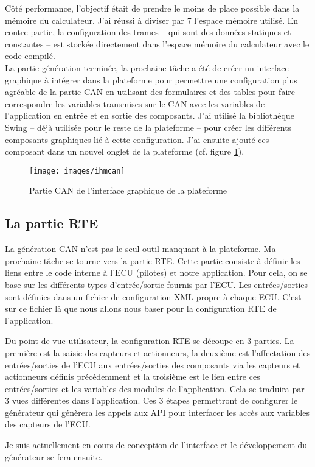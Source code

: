 Côté performance, l'objectif était de prendre le moins de place possible dans la
mémoire du calculateur. J'ai réussi à diviser par 7 l'espace mémoire utilisé. En
contre partie, la configuration des trames -- qui sont des données statiques et
constantes -- est stockée directement dans l'espace mémoire du calculateur avec
le code compilé.\\

La partie génération terminée, la prochaine tâche a été de créer un interface
graphique à intégrer dans la plateforme pour permettre une configuration plus
agréable de la partie CAN en utilisant des formulaires et des tables pour faire
correspondre les variables transmises sur le CAN avec les variables de
l'application en entrée et en sortie des composants. J'ai utilisé la
bibliothèque Swing -- déjà utilisée pour le reste de la plateforme -- pour
créer les différents composants graphiques lié à cette configuration. J'ai
ensuite ajouté ces composant dans un nouvel onglet de la plateforme (cf. figure
\ref{fig:ihmcan}).


\begin{figure}[h]
 \centering
 \texttt{[image: images/ihmcan]}
 \caption{Partie CAN de l'interface graphique de la plateforme}
 \label{fig:ihmcan}
\end{figure}


\subsection{La partie RTE}
La génération CAN n'est pas le seul outil manquant à la plateforme. Ma
prochaine tâche se tourne vers la partie RTE.  Cette partie consiste à définir
les liens entre le code interne à l'ECU (pilotes) et notre application. Pour
cela, on se base sur les différents types d'entrée/sortie fournis par l'ECU. Les
entrées/sorties sont définies dans un fichier de configuration XML propre à
chaque ECU. C'est sur ce fichier là que nous allons nous baser pour la
configuration RTE de l'application.

Du point de vue utilisateur, la configuration RTE se découpe en 3 parties. La
première est la saisie des capteurs et actionneurs, la deuxième est
l'affectation des entrées/sorties de l'ECU aux entrées/sorties des composants
via les capteurs et actionneurs définis précédemment et la troisième est le lien
entre ces entrées/sorties et les variables des modules de l'application. Cela se
traduira par 3 vues différentes dans l'application. Ces 3 étapes permettront de
configurer le générateur qui génèrera les appels aux API pour interfacer les
accès aux variables des capteurs de l'ECU.

Je suis actuellement en cours de conception de l'interface et le développement
du générateur se fera ensuite.


